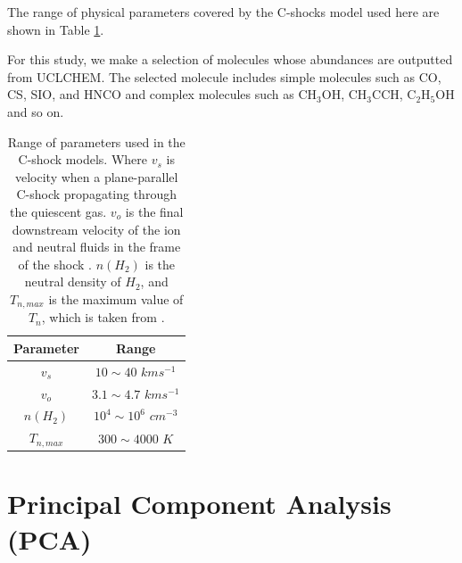 \documentclass{aa}
\begin{document}
\begin{CJK*}{UTF8}{gbsn}
   The range of physical parameters covered by the C-shocks model used here are shown in Table \ref{tab:physparam-shock}.
   
   For this study, we make a selection of molecules whose abundances are outputted from UCLCHEM. The selected molecule includes simple molecules such as CO, CS, SIO, and HNCO and complex molecules such as CH$_3$OH, CH$_3$CCH, C$_2$H$_5$OH and so on. 
 
    \begin{table}[]
    \centering
    \begin{tabular}{cc}
    \hline\hline
    Parameter           & Range               \\
    \hline
    $v_s$                                & $10\sim 40$ $kms^{-1}$  \\
    $v_o$                             & $3.1 \sim 4.7$ $kms^{-1}$ \\
    $n(H_2)$                        & $10^4 \sim 10^6$ $ cm^{-3}$  \\
    $T_{n,max}$                         & $300 \sim 4000$ $K$ \\
    \hline
    \end{tabular}
    \caption{Range of parameters used in the C-shock models. Where $v_s$ is velocity when a plane-parallel C-shock propagating through the quiescent gas. $v_o$ is the final downstream velocity of the ion and neutral fluids in the frame of the shock \citep{jimenez2008parametrization}. $n(H_2)$ is the neutral density of $H_2$, and $T_{n,max}$ is the maximum value of $T_n$, which is taken from \citep{draine1983magnetohydrodynamic}.}
    \label{tab:physparam-shock}
    \end{table}
   

\section{Principal Component Analysis (PCA)}


\end{CJK*}
\end{document}
